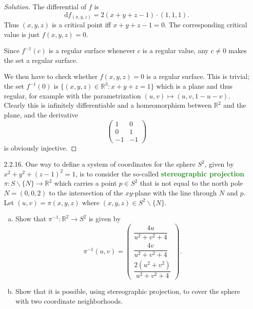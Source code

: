\documentclass[10pt]{scrartcl}
\providecommand{\RR}{\mathbb R}
\providecommand{\ii}{\item}
\providecommand{\setdiff}{\smallsetminus}
\providecommand{\inv}{^{-1}}
\newenvironment{soln}{\begin{proof}[Solution]}{\end{proof}}
\providecommand{\vocab}[1]{{\textbf{\textcolor{ForestGreen}{#1}}}}
\begin{document}
\begin{soln}
	The differential of $f$ is
	\[\mathrm df_{(x,y,z)} = 2(x+y+z-1)\cdot(1,1,1).\]
	Thus $(x,y,z)$ is a critical point iff $x+y+z-1 = 0$.
	The corresponding critical value is just $f(x,y,z) = 0$.
	
	Since $f\inv(c)$ is a regular surface
	whenever $c$ is a regular value, any $c\ne 0$ makes the set
	a regular surface.
	
	We then have to check whether $f(x,y,z) = 0$ is a regular surface.
	This is trivial; the set $f\inv(0)$ is $\{(x,y,z)\in\RR^3:x+y+z=1\}$
	which is a plane and thus regular,
	for example with the parametrization $(u,v)\mapsto(u,v,1-u-v)$.
	Clearly this is infinitely differentiable and a homeomorphism
	between $\RR^2$ and the plane, and the derivative
	\[\begin{pmatrix}
		1&0\\
		0&1\\
		-1&-1
	\end{pmatrix}\]
	is obviously injective.
\end{soln}

\begin{problem*}2.2.16.
	One way to define a system of coordinates for the sphere $S^2$,
	given by $x^2 + y^2 + (z-1)^2 = 1$, is to consider
	the so-called \vocab{stereographic projection}
	$\pi\colon S\setdiff\{N\}\to\RR^2$ which carries a point
	$p\in S^2$ that is not equal to the north pole $N = (0,0,2)$
	to the intersection of the $xy$-plane with the line through $N$ and $p$.
	Let $(u,v) = \pi(x,y,z)$ where $(x,y,z)\in S^2\setdiff\{N\}$.
	\begin{enumerate}[(a)]
		\ii Show that $\pi\inv\colon\RR^2\to S^2$ is given by
		\[\pi\inv(u, v) = \begin{pmatrix}
			\dfrac{4u}{u^2 + v^2 + 4}\\[2ex]
			\dfrac{4v}{u^2 + v^2 + 4}\\[2ex]
			\dfrac{2(u^2 + v^2)}{u^2 + v^2 + 4}
		\end{pmatrix}.\]
		\ii Show that it is possible, using stereographic projection,
		to cover the sphere with two coordinate neighborhoods.
	\end{enumerate}
\end{problem*}
\end{document}
